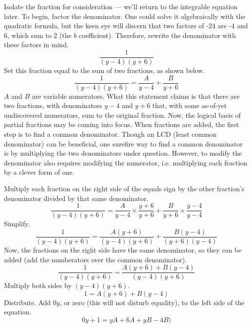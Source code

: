\documentclass{article}
\begin{document}
Isolate the fraction for consideration --- we'll return to the integrable equation later. To begin, factor the denominator. One could solve it algebraically with the quadratic formula, but the keen eye will discern that two factors of -24 are -4 and 6, which sum to 2 (the $b$ coefficient). Therefore, rewrite the denominator with these factors in mind.
\begin{equation*}
    \frac{1}{(y-4)(y+6)}
\end{equation*}
Set this fraction equal to the sum of two fractions, as shown below.
\begin{equation}
    \frac{1}{(y-4)(y+6)}=\frac{A}{y-4}+\frac{B}{y+6}
\end{equation}
$A$ and $B$ are variable numerators. What this statement claims is that there are two fractions, with denominators $y-4$ and $y+6$ that, with some as-of-yet undiscovered numerators, sum to the original fraction. Now, the logical basis of partial fractions may be coming into focus. When fractions are added, the first step is to find a common denominator. Though an LCD (least common denominator) can be beneficial, one surefire way to find a common denominator is by multiplying the two denominators under question. However, to modify the denominator also requires modifying the numerator, i.e. multiplying each fraction by a clever form of one.\par
Multiply each fraction on the right side of the equals sign by the other fraction's denominator divided by that same denominator.
\begin{equation*}
    \frac{1}{(y-4)(y+6)}=\frac{A}{y-4}\times\frac{y+6}{y+6}+\frac{B}{y+6}\times\frac{y-4}{y-4}
\end{equation*}
Simplify.
\begin{equation*}
    \frac{1}{(y-4)(y+6)}=\frac{A(y+6)}{(y-4)(y+6)}+\frac{B(y-4)}{(y+6)(y-4)}
\end{equation*}
Now, the fractions on the right side have the same denominator, so they can be added (add the numberators over the common denominator).
\begin{equation*}
    \frac{1}{(y-4)(y+6)}=\frac{A(y+6)+B(y-4)}{(y-4)(y+6)}
\end{equation*}
Multiply both sides by $(y-4)(y+6)$.
\begin{equation*}
    1=A(y+6)+B(y-4)
\end{equation*}
Distribute. Add $0y$, or zero (this will not disturb equality), to the left side of the equation.
\begin{equation*}
    0y+1=yA+6A+yB-4B)
\end{equation*}
\end{document}
